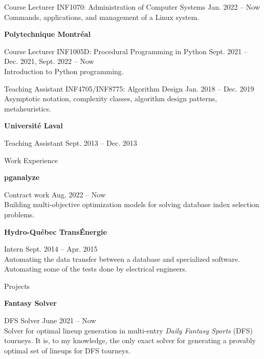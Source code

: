 \documentclass[letterpaper,MMMyyyy,nonstopmode]{simpleresumecv}
\begin{document}
\begin{Body}
Course Lecturer
\BulletItem
INF1070: Administration of Computer Systems
\hfill
Jan. 2022 -- Now
\small \\ Commands, applications, and management of a Linux system. \normalsize

\Gap\Gap
\Entry
\textbf{Polytechnique Montréal}

Course Lecturer
\BulletItem
INF1005D: Procedural Programming in Python
\hfill
Sept. 2021 -- Dec. 2021, Sept. 2022 -- Now
\small \\ Introduction to Python programming. \normalsize

\Gap\Gap
Teaching Assistant
\BulletItem
INF4705/INF8775: Algorithm Design
\hfill
Jan. 2018 -- Dec. 2019
\small \\ Asymptotic notation, complexity classes, algorithm design patterns, metaheuristics. \normalsize

\pagebreak %

\Gap\Gap
\Entry
\textbf{Université Laval}

\Gap\Gap
Teaching Assistant
\hfill Sept. 2013 -- Dec. 2013


\Section
{Work \quad\quad Experience}{}{}

\Entry
\textbf{pganalyze}

Contract work
\hfill
Aug. 2022 -- Now
\small \\ Building multi-objective optimization models for solving database index selection problems.\normalsize

\Gap\Gap
\Entry
\textbf{Hydro-Québec TransÉnergie}

Intern
\hfill
Sept. 2014 -- Apr. 2015
\small \\ Automating the data transfer between a database and specialized software. Automating some of the tests done by electrical engineers.\normalsize


\Section
{Projects}{}{}

\Entry
\textbf{Fantasy Solver}

DFS Solver
\hfill
June 2021 -- Now
\small \\ Solver for optimal lineup generation in multi-entry \emph{Daily Fantasy Sports} (DFS) tourneys. It is, to my knowledge, the only exact solver for generating a provably optimal set of lineups for DFS tourneys.\normalsize



\end{Body}
\end{document}
